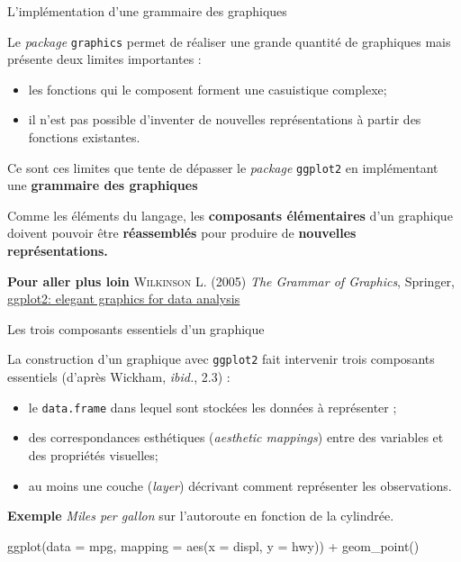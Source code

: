 \documentclass[12pt,handout,ignorenonframetext,]{beamer}
\newenvironment{Shaded}{}{}
\newcommand{\KeywordTok}[1]{\textcolor[rgb]{0.00,0.00,1.00}{{#1}}}
\newcommand{\DataTypeTok}[1]{{#1}}
\newcommand{\StringTok}[1]{\textcolor[rgb]{0.00,0.50,0.50}{{#1}}}
\newcommand{\NormalTok}[1]{{#1}}
\providecommand{\tightlist}{%
\setlength{\itemsep}{0pt}\setlength{\parskip}{0pt}}
\renewenvironment{Shaded}{\begin{snugshade}}{\end{snugshade}}
\begin{document}
\begin{frame}[fragile]{\large L'implémentation d'une grammaire des
graphiques}

Le \emph{package} \texttt{graphics} permet de réaliser une grande
quantité de graphiques mais présente deux limites importantes :

\begin{itemize}
\tightlist
\item
  les fonctions qui le composent forment une casuistique complexe;
\item
  il n'est pas possible d'inventer de nouvelles représentations à partir
  des fonctions existantes.
\end{itemize}

\pause Ce sont ces limites que tente de dépasser le \emph{package}
\texttt{ggplot2} en implémentant une \textbf{grammaire des graphiques}

Comme les éléments du langage, les \textbf{composants élémentaires} d'un
graphique doivent pouvoir être \textbf{réassemblés} pour produire de
\textbf{nouvelles représentations.}

\pause 

\textbf{Pour aller plus loin} \textsc{Wilkinson L.} (2005)
\textit{The Grammar of Graphics}, Springer,
\href{https://github.com/hadley/ggplot2-book}{\underline{ggplot2: elegant graphics for data analysis}}

\end{frame}

\begin{frame}[fragile]{\large Les trois composants essentiels d'un
graphique}

La construction d'un graphique avec \texttt{ggplot2} fait intervenir
trois composants essentiels (d'après Wickham, \emph{ibid.}, 2.3) :

\begin{itemize}
\tightlist
\item
  le \texttt{data.frame} dans lequel sont stockées les données à
  représenter ;
\item
  des correspondances esthétiques (\emph{aesthetic mappings}) entre des
  variables et des propriétés visuelles;
\item
  au moins une couche (\emph{layer}) décrivant comment représenter les
  observations.
\end{itemize}

\pause 

\textbf{Exemple} \emph{Miles per gallon} sur l'autoroute en fonction de
la cylindrée.

\center \small 

\begin{Shaded}
\begin{Highlighting}[]
\KeywordTok{ggplot}\NormalTok{(}\DataTypeTok{data =} \NormalTok{mpg, }\DataTypeTok{mapping =} \KeywordTok{aes}\NormalTok{(}\DataTypeTok{x =} \NormalTok{displ, }\DataTypeTok{y =} \NormalTok{hwy)) +}
\StringTok{  }\KeywordTok{geom_point}\NormalTok{()}
\end{Highlighting}
\end{Shaded}

\end{frame}
\end{document}
